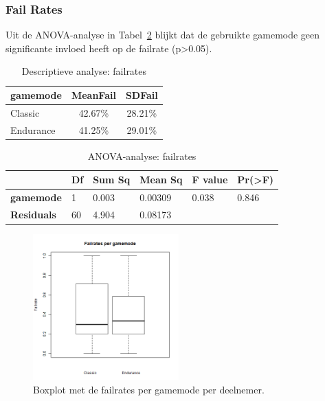 \documentclass[11pt]{article}
\begin{document}
\subsubsection{Fail Rates}
Uit de ANOVA-analyse in Tabel~\ref{ANOVA-failrate} blijkt dat de gebruikte gamemode geen significante invloed heeft op de failrate (p\textgreater 0.05).
    \begin{table}[h]
		\centering
		\begin{tabular}{|lcc|}
        	\hline
			\textbf{gamemode} & \textbf{MeanFail} & \textbf{SDFail} \\
            \hline
			Classic & 42.67\% & 28.21\%  \\
			Endurance & 41.25\% & 29.01\% \\
			\hline
		\end{tabular}
		\caption{Descriptieve analyse: failrates}\label{analyse:failrates}
    \end{table}

\begin{table}[h]
\centering
\begin{tabular}{|llllll|}
\hline
 & \textbf{Df} & \textbf{Sum Sq}   & \textbf{Mean Sq} & \textbf{F value} & \textbf{Pr(\textgreater F)} \\
 \hline
\textbf{gamemode}  & 1  & 0.003    & 0.00309 & 0.038   & 0.846             \\
\textbf{Residuals} & 60 & 4.904    & 0.08173 &         &                   \\
\hline
\end{tabular}
\caption{ANOVA-analyse: failrates}
\label{ANOVA-failrate}
\end{table}

\begin{figure}[h]
	\centering
	\includegraphics[width=0.5\textwidth]{pictures/Failrates.png}
    \caption{Boxplot met de failrates per gamemode per deelnemer.}
    \label{failrates:gamemode}
\end{figure}
\end{document}
